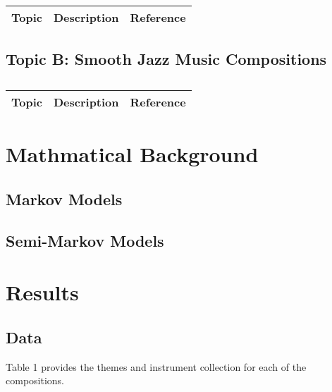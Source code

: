 \centering	
\begin{table}[H]\tiny
	\caption{}	
	\begin{tabular}{r|p{4cm}|l}
		\hline	
		Topic & Description & Reference \\
		\hline 
		\hline 
	\end{tabular}
\end{table}

\subsection{Topic B: Smooth Jazz Music Compositions}

\centering	
\begin{table}[H]\tiny
	\caption{}	
	\begin{tabular}{r|p{4cm}|l}
		\hline	
		Topic & Description & Reference \\
		\hline 
		\hline 
	\end{tabular}
\end{table}

\section{Mathmatical Background}

\subsection{Markov Models}

\subsection{Semi-Markov Models}


\section{Results}

\subsection{Data}

Table 1 provides the themes and instrument collection for each of the compositions.
	
